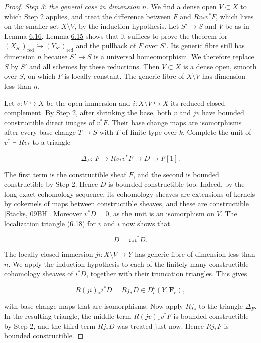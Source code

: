 \documentclass[11pt]{article}
\providecommand{\Dbc}{}\renewcommand{\Dbc}{D^b_c}
\providecommand{\Fell}{}\renewcommand{\Fell}{\mathbf F_\ell}
\begin{document}
\begin{proof}[{Proof}]
\emph{Step 3: the general case in dimension \(n\).} We find a dense open \(V\subset X\) to which Step 2 applies, and treat the difference between \(F\) and \(Rv_*v^*F\), which lives on the smaller set \(X\setminus V\), by the induction hypothesis. Let \(S'\to S\) and \(V\) be as in Lemma \hyperref[bp49]{6.16}. Lemma \hyperref[bp47]{6.15} shows that it suffices to prove the theorem for \((X_{S'})_{\mathrm{red}}\hookrightarrow(Y_{S'})_{\mathrm{red}}\) and the pullback of \(F\) over \(S'\). Its generic fibre still has dimension \(n\) because \(S'\to S\) is a universal homeomorphism. We therefore replace \(S\) by \(S'\) and all schemes by these reductions. Then \(V\subset X\) is a dense open, smooth over \(S\), on which \(F\) is locally constant. The generic fibre of \(X\setminus V\) has dimension less than \(n\).

Let \(v:V\hookrightarrow X\) be the open immersion and \(i:X\setminus V\hookrightarrow X\) its reduced closed complement. By Step 2, after shrinking the base, both \(v\) and \(jv\) have bounded constructible direct images of \(v^*F\). Their base change maps are isomorphisms after every base change \(T\to S\) with \(T\) of finite type over \(k\). Complete the unit of \(v^*\dashv Rv_*\) to a triangle

\[
\Delta_F:\ F\longrightarrow Rv_*v^*F\longrightarrow D
\longrightarrow F[1].
\tag{6.21}
\]

The first term is the constructible sheaf \(F\), and the second is bounded constructible by Step 2. Hence \(D\) is bounded constructible too. Indeed, by the long exact cohomology sequence, its cohomology sheaves are extensions of kernels by cokernels of maps between constructible sheaves, and these are constructible [Stacks, \href{https://stacks.math.columbia.edu/tag/09BH}{09BH}]. Moreover \(v^*D=0\), as the unit is an isomorphism on \(V\). The localization triangle (6.18) for \(v\) and \(i\) now shows that

\[
D=i_*i^*D.
\]

The locally closed immersion \(ji:X\setminus V\to Y\) has generic fibre of dimension less than \(n\). We apply the induction hypothesis to each of the finitely many constructible cohomology sheaves of \(i^*D\), together with their truncation triangles. This gives

\[
R(ji)_*i^*D=Rj_*D\in\Dbc(Y,\Fell),
\]

with base change maps that are isomorphisms. Now apply \(Rj_*\) to the triangle \(\Delta_F\). In the resulting triangle, the middle term \(R(jv)_*v^*F\) is bounded constructible by Step 2, and the third term \(Rj_*D\) was treated just now. Hence \(Rj_*F\) is bounded constructible.


\end{proof}
\end{document}
